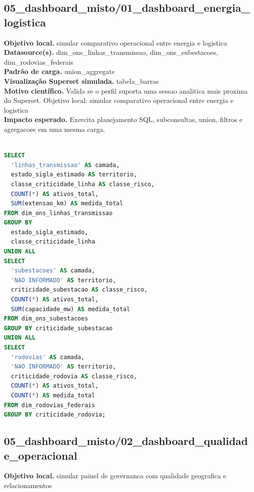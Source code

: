\documentclass[11pt,a4paper]{article}
\begin{document}
\subsection{05\_dashboard\_misto/01\_dashboard\_energia\_logistica}

\textbf{Objetivo local.} simular comparativo operacional entre energia e logistica\\

\textbf{Datasource(s).} dim\_ons\_linhas\_transmissao, dim\_ons\_subestacoes, dim\_rodovias\_federais\\

\textbf{Padrão de carga.} union\_aggregate\\

\textbf{Visualização Superset simulada.} tabela\_barras\\

\textbf{Motivo científico.} Valida se o perfil suporta uma sessao analitica mais proxima do Superset. Objetivo local: simular comparativo operacional entre energia e logistica\\

\textbf{Impacto esperado.} Exercita planejamento SQL, subconsultas, union, filtros e agregacoes em uma mesma carga.

\begin{lstlisting}[language=SQL]

SELECT
  'linhas_transmissao' AS camada,
  estado_sigla_estimado AS territorio,
  classe_criticidade_linha AS classe_risco,
  COUNT(*) AS ativos_total,
  SUM(extensao_km) AS medida_total
FROM dim_ons_linhas_transmissao
GROUP BY
  estado_sigla_estimado,
  classe_criticidade_linha
UNION ALL
SELECT
  'subestacoes' AS camada,
  'NAO INFORMADO' AS territorio,
  criticidade_subestacao AS classe_risco,
  COUNT(*) AS ativos_total,
  SUM(capacidade_mw) AS medida_total
FROM dim_ons_subestacoes
GROUP BY criticidade_subestacao
UNION ALL
SELECT
  'rodovias' AS camada,
  'NAO INFORMADO' AS territorio,
  criticidade_rodovia AS classe_risco,
  COUNT(*) AS ativos_total,
  COUNT(*) AS medida_total
FROM dim_rodovias_federais
GROUP BY criticidade_rodovia;

\end{lstlisting}

\subsection{05\_dashboard\_misto/02\_dashboard\_qualidade\_operacional}

\textbf{Objetivo local.} simular painel de governanca com qualidade geografica e relacionamentos\\
\end{document}
